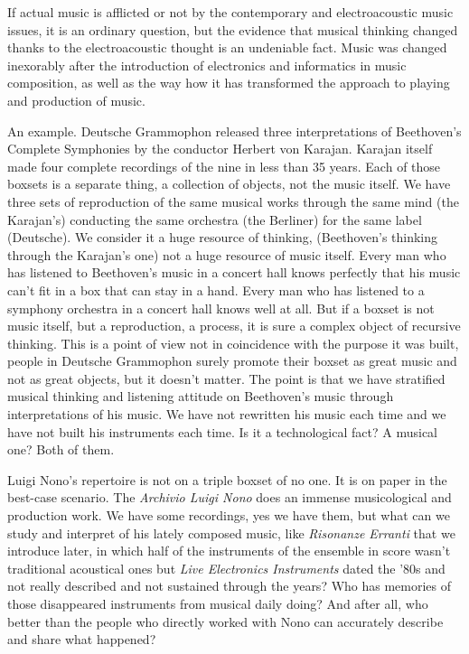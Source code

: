 \documentclass[twoside,a4paper]{article}
\begin{document}
If actual music is afflicted or not by the contemporary and electroacoustic music issues, it is an ordinary question, but the evidence that musical thinking changed thanks to the electroacoustic thought is an undeniable fact. Music was changed inexorably after the introduction of electronics and informatics in music composition, as well as the way how it has transformed the approach to playing and production of music.

An example. Deutsche Grammophon released three interpretations of Beethoven's Complete Symphonies by the conductor Herbert von Karajan. Karajan itself made four complete recordings of the nine in less than 35 years. Each of those boxsets is a separate thing, a collection of objects, not the music itself. We have three sets of reproduction of the same musical works through the same mind (the Karajan's) conducting the same orchestra (the Berliner) for the same label (Deutsche). We consider it a huge resource of thinking, (Beethoven's thinking through the Karajan's one) not a huge resource of music itself. Every man who has listened to Beethoven's music in a concert hall knows perfectly that his music can't fit in a box that can stay in a hand. Every man who has listened to a symphony orchestra in a concert hall knows well at all. But if a boxset is not music itself, but a reproduction, a process, it is sure a complex object of recursive thinking. This is a point of view not in coincidence with the purpose it was built, people in Deutsche Grammophon surely promote their boxset as great music and not as great objects, but it doesn't matter. The point is that we have stratified musical thinking and listening attitude on Beethoven's music through interpretations of his music. We have not rewritten his music each time and we have not built his instruments each time. Is it a technological fact? A musical one? Both of them.

Luigi Nono's repertoire is not on a triple boxset of no one. It is on paper in the best-case scenario. The \emph{Archivio Luigi Nono} does an immense musicological and production work. We have some recordings, yes we have them, but what can we study and interpret of his lately composed music, like \emph{Risonanze Erranti} that we introduce later, in which half of the instruments of the ensemble in score wasn't traditional acoustical ones but \emph{Live Electronics Instruments} dated the '80s and not really described and not sustained through the years? Who has memories of those disappeared instruments from musical daily doing? And after all, who better than the people who directly worked with Nono can accurately describe and share what happened?
\end{document}
